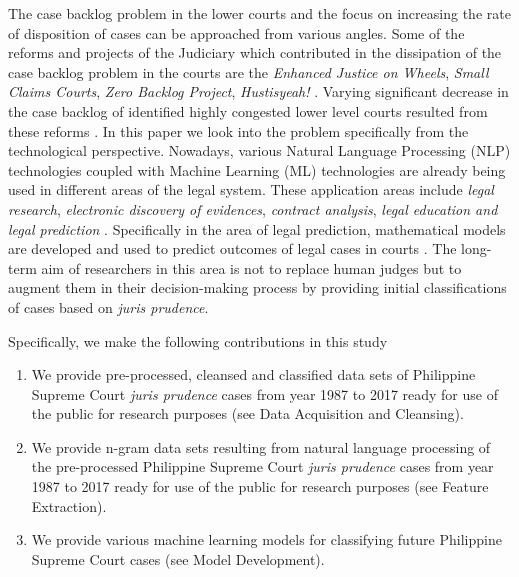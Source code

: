 \documentclass[letterpaper]{article} %
\begin{document}
The case backlog problem in the lower courts and the focus on increasing the rate of disposition of cases can be approached from various angles. Some of the reforms and projects of the Judiciary which contributed in the dissipation of the case backlog problem in the courts are the \textit{Enhanced Justice on Wheels}, \textit{Small Claims Courts}, \textit{Zero Backlog Project}, \textit{Hustisyeah!} . Varying significant decrease in the case backlog of identified highly congested lower level courts resulted from these reforms . In this paper we look into the problem specifically from the technological perspective.  Nowadays, various Natural Language Processing (NLP) technologies coupled with Machine Learning (ML) technologies are already being used in different areas of the legal system. These application areas include \textit{legal research}, \textit{electronic discovery of evidences}, \textit{contract analysis}, \textit{legal education and legal prediction} . Specifically in the area of legal prediction, mathematical models are developed and used to predict outcomes of legal cases in courts . The long-term aim of researchers in this area is not to replace human judges but to augment them in their decision-making process by providing initial classifications of cases based on \textit{juris prudence}. 

Specifically, we make the following contributions in this study
\begin{enumerate}
\item We provide pre-processed, cleansed and classified data sets of Philippine Supreme Court \textit{juris prudence} cases from year 1987 to 2017 ready for use of the public for research purposes (see Data Acquisition and Cleansing).
\item We provide n-gram data sets resulting from natural language processing of the pre-processed Philippine Supreme Court \textit{juris prudence} cases from year 1987 to 2017 ready for use of the public for research purposes (see Feature Extraction).
\item We provide various machine learning models for classifying future Philippine Supreme Court cases (see Model Development).
\end{enumerate}
\end{document}

